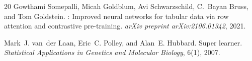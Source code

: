 \documentclass[11pt]{article}
\begin{document}
\begin{thebibliography}{20}
Gowthami Somepalli, Micah Goldblum, Avi Schwarzschild, C.~Bayan Bruss, and
  Tom Goldstein.
: Improved neural networks for tabular data via row attention
  and contrastive pre-training.
\newblock \emph{arXiv preprint arXiv:2106.01342}, 2021.

Mark~J. van~der Laan, Eric~C. Polley, and Alan~E. Hubbard.
\newblock Super learner.
\newblock \emph{Statistical Applications in Genetics and Molecular Biology},
  6(1), 2007.

\end{thebibliography}
\end{document}

